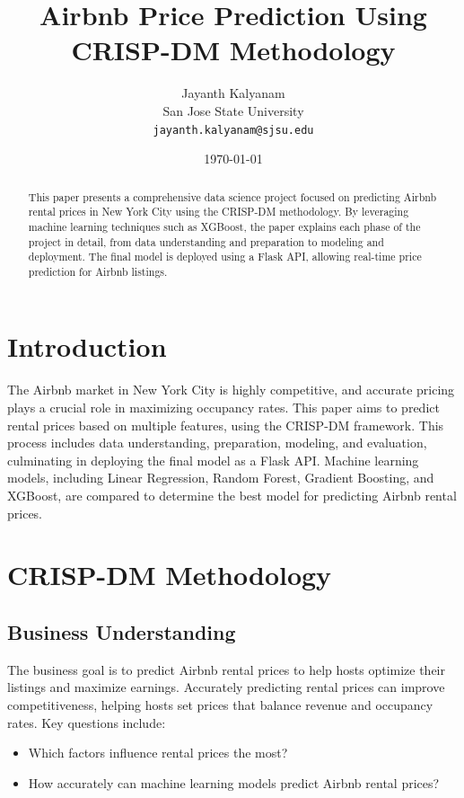 \documentclass{article}
\title{Airbnb Price Prediction Using CRISP-DM Methodology}
\author{Jayanth Kalyanam \\ San Jose State University \\ \texttt{jayanth.kalyanam@sjsu.edu}}
\date{\today}
\begin{document}
\maketitle

\begin{abstract}
This paper presents a comprehensive data science project focused on predicting Airbnb rental prices in New York City using the CRISP-DM methodology. By leveraging machine learning techniques such as XGBoost, the paper explains each phase of the project in detail, from data understanding and preparation to modeling and deployment. The final model is deployed using a Flask API, allowing real-time price prediction for Airbnb listings.
\end{abstract}

\section{Introduction}
The Airbnb market in New York City is highly competitive, and accurate pricing plays a crucial role in maximizing occupancy rates. This paper aims to predict rental prices based on multiple features, using the CRISP-DM framework. This process includes data understanding, preparation, modeling, and evaluation, culminating in deploying the final model as a Flask API. Machine learning models, including Linear Regression, Random Forest, Gradient Boosting, and XGBoost, are compared to determine the best model for predicting Airbnb rental prices.

\section{CRISP-DM Methodology}

\subsection{Business Understanding}
The business goal is to predict Airbnb rental prices to help hosts optimize their listings and maximize earnings. Accurately predicting rental prices can improve competitiveness, helping hosts set prices that balance revenue and occupancy rates. Key questions include:
\begin{itemize}
    \item Which factors influence rental prices the most?
    \item How accurately can machine learning models predict Airbnb rental prices?
\end{itemize}
\end{document}
